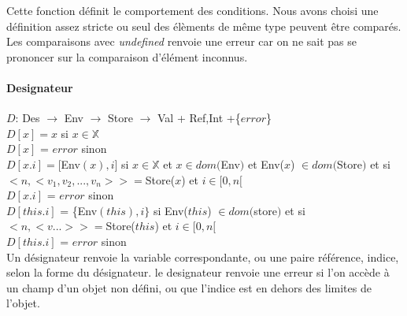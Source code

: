 Cette fonction définit le comportement des conditions. Nous avons choisi une
définition assez stricte ou seul des élèments de même type peuvent être comparés. 
Les comparaisons avec \emph{undefined} renvoie une erreur car on ne sait pas se 
prononcer sur la comparaison d'élément inconnus. 

\paragraph{Designateur} $D$: Des $\rightarrow$ Env $\rightarrow$ Store $\rightarrow$ Val + {Ref,Int} +\{$error$\} \\
$D[x] = x$ si $x \in \mathbb{X}$ \\
$D[x]$ = $error$ sinon \\
$D[x.i] = [ $Env$(x), i ]$ si $ x \in \mathbb{X}$ et $x \in dom($Env$) $ et Env($x$) $\in dom($Store$)$ et si
	$<n,<v_1,v_2,...,v_n> > =$Store($x$) et $ i \in [0,n[$ \\
$D[x.i]$ = $error$ sinon \\
$D[this.i]$ = \{Env$(this), i\}$ si Env($this$) $\in dom($store$)$ et si
	$< n,< v ...>> = $Store($this$) et $ i \in [0,n[$ \\
$D[this.i]$ = $error$ sinon \\
Un désignateur renvoie la variable correspondante, ou une paire référence, indice, selon la forme du désignateur.
le designateur renvoie une erreur si l'on accède à un champ d'un objet non défini, ou que l'indice est en dehors
des limites de l'objet. 

